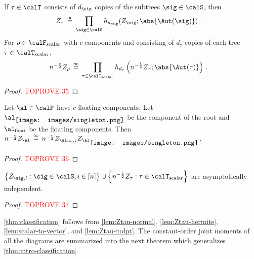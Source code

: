 \documentclass[12pt]{article}
\newcommand{\smallrootpic}{\vcenter{\hbox{\texttt{[image: images/singleton.png]}}}}
\newcommand{\scalar}{\textnormal{scalar}}
\newcommand{\eqinf}{\,\overset{\infty}{=}\,}
\begin{document}
\begin{lemma}\label{lem:Ztau-hermite}
    If $\tau \in \calT$ consists of
    $d_\sig$ copies of the subtrees $\sig \in \calS$, then
    \[Z_{\tau} \eqinf \prod_{\sig \in \calS} h_{d_\sig}(Z_{\sig}; \abs{\Aut(\sig)})\,.\]
    For $\rho \in \calF_{\scalar}$ with $c$ components and
    consisting of $d_\tau$ copies of each tree $\tau \in \calT_{\scalar}$,
    \[n^{-\frac c 2} Z_\rho \eqinf \prod_{\tau \in \calT_{\scalar}} h_{d_\tau}\left(n^{-\frac 1 2}Z_{\tau}; \abs{\Aut(\tau)}\right)\,.\]
\end{lemma}
\begin{proof}\textcolor{red}{TOPROVE 35}\end{proof}


\begin{lemma}\label{lem:scalar-to-vector}
    Let $\al \in \calF$ have $c$ floating components.
    Let $\al_{\smallrootpic}$ be the component of the root
    and $\al_{\textnormal{float}}$ be the floating components. Then
    $n^{- \frac c 2}Z_\al \eqinf n^{- \frac c 2} Z_{\al_{\textnormal{float}}}Z_{\al_{\smallrootpic}}$.
\end{lemma}
\begin{proof}\textcolor{red}{TOPROVE 36}\end{proof}


\begin{lemma}
\label{lem:Ztau-indpt}
    $\left\{Z_{\sig, i} : \sig \in \calS, i \in [n]\right\} \cup \left\{n^{-\frac 1 2}Z_\tau : \tau \in \calT_{\scalar}\right\}$ are asymptotically
    independent.
\end{lemma}
\begin{proof}\textcolor{red}{TOPROVE 37}\end{proof}

\cref{thm:classification} follows from \cref{lem:Ztau-normal}, \cref{lem:Ztau-hermite}, \cref{lem:scalar-to-vector}, and \cref{lem:Ztau-indpt}.
The constant-order joint moments of all the diagrams
are summarized into the next theorem which generalizes \cref{thm:intro-classification}.
\end{document}
